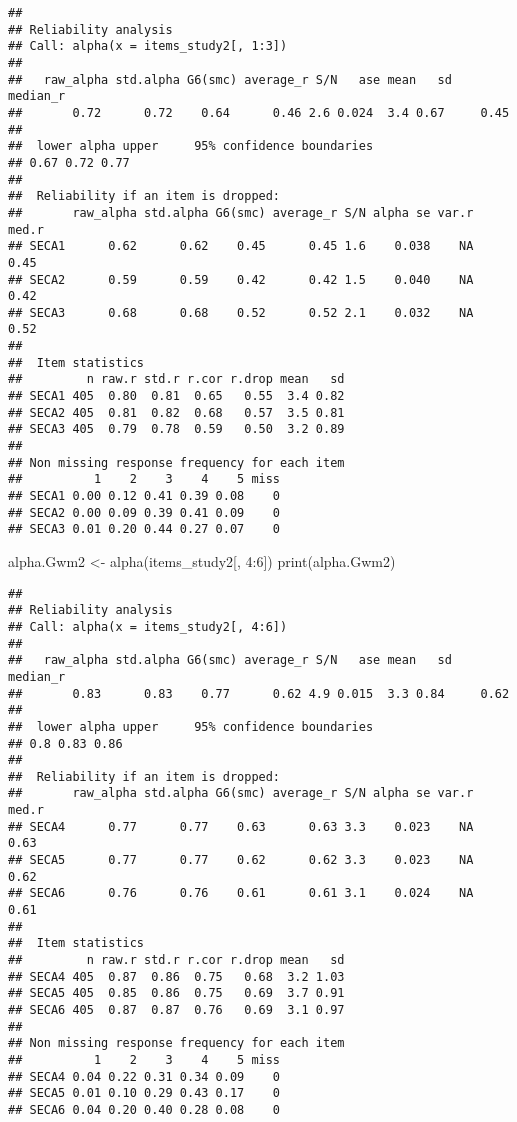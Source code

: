 \documentclass[
]{article}
\newenvironment{Shaded}{\begin{snugshade}}{\end{snugshade}}
\newcommand{\DecValTok}[1]{\textcolor[rgb]{0.00,0.00,0.81}{#1}}
\newcommand{\FunctionTok}[1]{\textcolor[rgb]{0.00,0.00,0.00}{#1}}
\newcommand{\NormalTok}[1]{#1}
\newcommand{\OtherTok}[1]{\textcolor[rgb]{0.56,0.35,0.01}{#1}}
\newcommand{\SpecialCharTok}[1]{\textcolor[rgb]{0.00,0.00,0.00}{#1}}
\begin{document}
\begin{verbatim}
## 
## Reliability analysis   
## Call: alpha(x = items_study2[, 1:3])
## 
##   raw_alpha std.alpha G6(smc) average_r S/N   ase mean   sd median_r
##       0.72      0.72    0.64      0.46 2.6 0.024  3.4 0.67     0.45
## 
##  lower alpha upper     95% confidence boundaries
## 0.67 0.72 0.77 
## 
##  Reliability if an item is dropped:
##       raw_alpha std.alpha G6(smc) average_r S/N alpha se var.r med.r
## SECA1      0.62      0.62    0.45      0.45 1.6    0.038    NA  0.45
## SECA2      0.59      0.59    0.42      0.42 1.5    0.040    NA  0.42
## SECA3      0.68      0.68    0.52      0.52 2.1    0.032    NA  0.52
## 
##  Item statistics 
##         n raw.r std.r r.cor r.drop mean   sd
## SECA1 405  0.80  0.81  0.65   0.55  3.4 0.82
## SECA2 405  0.81  0.82  0.68   0.57  3.5 0.81
## SECA3 405  0.79  0.78  0.59   0.50  3.2 0.89
## 
## Non missing response frequency for each item
##          1    2    3    4    5 miss
## SECA1 0.00 0.12 0.41 0.39 0.08    0
## SECA2 0.00 0.09 0.39 0.41 0.09    0
## SECA3 0.01 0.20 0.44 0.27 0.07    0
\end{verbatim}

\begin{Shaded}
\begin{Highlighting}[]
\NormalTok{alpha.Gwm2 }\OtherTok{\textless{}{-}} \FunctionTok{alpha}\NormalTok{(items\_study2[, }\DecValTok{4}\SpecialCharTok{:}\DecValTok{6}\NormalTok{])}
\FunctionTok{print}\NormalTok{(alpha.Gwm2)}
\end{Highlighting}
\end{Shaded}

\begin{verbatim}
## 
## Reliability analysis   
## Call: alpha(x = items_study2[, 4:6])
## 
##   raw_alpha std.alpha G6(smc) average_r S/N   ase mean   sd median_r
##       0.83      0.83    0.77      0.62 4.9 0.015  3.3 0.84     0.62
## 
##  lower alpha upper     95% confidence boundaries
## 0.8 0.83 0.86 
## 
##  Reliability if an item is dropped:
##       raw_alpha std.alpha G6(smc) average_r S/N alpha se var.r med.r
## SECA4      0.77      0.77    0.63      0.63 3.3    0.023    NA  0.63
## SECA5      0.77      0.77    0.62      0.62 3.3    0.023    NA  0.62
## SECA6      0.76      0.76    0.61      0.61 3.1    0.024    NA  0.61
## 
##  Item statistics 
##         n raw.r std.r r.cor r.drop mean   sd
## SECA4 405  0.87  0.86  0.75   0.68  3.2 1.03
## SECA5 405  0.85  0.86  0.75   0.69  3.7 0.91
## SECA6 405  0.87  0.87  0.76   0.69  3.1 0.97
## 
## Non missing response frequency for each item
##          1    2    3    4    5 miss
## SECA4 0.04 0.22 0.31 0.34 0.09    0
## SECA5 0.01 0.10 0.29 0.43 0.17    0
## SECA6 0.04 0.20 0.40 0.28 0.08    0
\end{verbatim}
\end{document}
